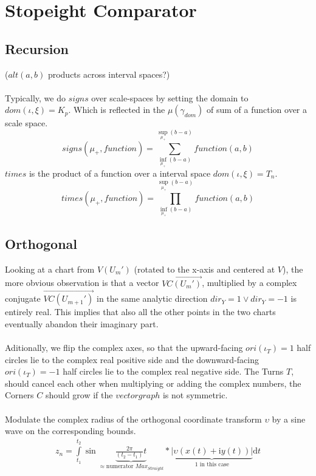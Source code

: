 \documentclass{report}
\begin{document}
\section{Stopeight Comparator}

\subsection{Recursion}
($alt(a,b)$ products across interval spaces?)\\\\
Typically, we do $signs$ over scale-spaces by setting the domain to $dom(\iota,\xi)=K_{p}$.
Which is reflected in the $\mu(\gamma_{dom})$ of sum of a function over a scale space.\\
\begin{equation}
signs(\mu_{+},function )= \sum \limits _{\inf \limits _{\mu_{+}} (b-a)}^{\sup \limits _{\mu_{+}} (b-a)} function (a,b)
\end{equation}
$times$ is the product of a function over a interval space $dom(\iota,\xi)=T_{n}$.
\begin{equation}
times(\mu_{+},function) = \prod_{\inf \limits _{\mu_{+}} (b-a)}^{\sup \limits _{\mu_{+}} (b-a)} function(a,b)
\end{equation}

\subsection{Orthogonal}
Looking at a chart from $V(U_{m}')$ (rotated to the x-axis and centered at $V$), the more obvious observation is that a vector $\overrightarrow{VC(U_{m}')}$, multiplied by a complex conjugate $\overrightarrow{VC(U_{m+1}')}$ in the same analytic direction $dir_{Y}=1\lor dir_{Y}=-1$ is entirely real. This implies that also all the other points in the two charts eventually abandon their imaginary part.\\\\
Aditionally, we flip the complex axes, so that the upward-facing $ori(\iota_{T})=1$ half circles lie to the complex real positive side and the downward-facing $ori(\iota_{T})=-1$ half circles lie to the complex real negative side. The Turns $T$, should cancel each other when multiplying or adding the complex numbers, the Corners $C$ should grow if the $vectorgraph$ is not symmetric.\\\\
Modulate the complex radius of the orthogonal coordinate transform $\upsilon$ by a sine wave on the corresponding bounds.
\begin{align}
z_{n} = \int \limits _{t_{1}}^{t_{2}} \sin \underbrace{\frac{2\pi}{(t_{2}-t_{1})}t}_{\approx \text{numerator }Max_{Straight}} * \underbrace{\lvert \upsilon (x(t)+\mathrm{i}y(t)) \rvert}_{1\text{ in this case}} \mathrm{d}t \label{eq:4}
\end{align}
\end{document}
